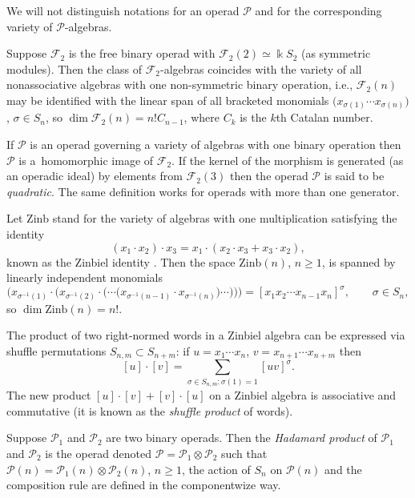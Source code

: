 \documentclass[pdftex]{sigma}
\numberwithin{equation}{section}
\def\Zinb{\mathrm{Zinb}}
\begin{document}
We will not distinguish notations for an operad $\mathcal P$
and for the corresponding variety of $\mathcal P$-algebras.

\begin{Example}
Suppose $\mathcal F_2$ is the free binary operad with
$\mathcal F_2(2) \simeq \Bbbk S_2$ (as symmetric modules).
Then the class of $\mathcal F_2$-algebras
coincides with the variety of all nonassociative
algebras with one non-symmetric binary operation,
i.e., $\mathcal F_2(n)$ may be identified with the
linear span of all bracketed monomials
$\bigl(x_{\sigma(1)}\cdots x_{\sigma(n)}\bigr)$, $\sigma \in S_n$,
so $\dim \mathcal F_2(n) = n! C_{n-1}$, where $C_k$ is the $k$th
Catalan number.
\end{Example}

If $\mathcal P$ is an operad governing a variety
of algebras with one binary operation then
$\mathcal P$ is a~homomorphic image of $\mathcal F_2$.
If the kernel of the morphism is generated (as an operadic ideal) by elements from $\mathcal F_2(3)$ then
the operad $\mathcal P$ is said to be {\em quadratic}.
The same definition works for operads with more than one generator.

\begin{Example}\label{exmp:Zinbiel}
Let $\Zinb$ stand for the variety of algebras with one multiplication
satisfying the identity
%
\begin{equation}\label{eq:Zinbiel}
(x_1\cdot x_2)\cdot x_3
= x_1\cdot (x_2\cdot x_3 + x_3\cdot x_2),
\end{equation}
%
known as the Zinbiel identity \cite{Loday}.
Then the space $\Zinb(n)$, $n\ge 1$, is spanned by
linearly independent monomials
\[
\bigl( x_{\sigma^{-1}(1)}\cdot \bigl(x_{\sigma^{-1}(2)}\cdot \bigl(\cdots \bigl(x_{\sigma^{-1}(n-1)}\cdot x_{\sigma^{-1}(n)}\bigr)\cdots \bigr)\bigr) \bigr)
=
[x_{1}x_{2}\cdots x_{n-1}x_{n}]^\sigma ,
\qquad \sigma \in S_n,
\]
so $\dim \Zinb(n)=n!$.

The product of two right-normed words in a Zinbiel algebra
can be expressed via shuffle permutations $S_{n,m}\subset S_{n+m}$: if $u= x_1\cdots x_n$, $v = x_{n+1}\cdots x_{n+m}$
then
\[
[u]\cdot [v]
=\sum\limits_{\sigma\in S_{n,m}\colon \sigma (1)=1}
[uv]^\sigma .
\]
The new product $[u]\cdot [v] + [v]\cdot [u]$
on a Zinbiel algebra
is associative and commutative (it is known as the {\em shuffle product}
of words).
\end{Example}


Suppose $\mathcal P_1$ and $\mathcal P_2$ are two binary operads.
Then the {\em Hadamard product} of $\mathcal P_1$ and $\mathcal P_2$ is the operad denoted
$\mathcal P= \mathcal P_1\otimes \mathcal P_2$ such that
$\mathcal P(n)= \mathcal P_1(n)\otimes \mathcal P_2(n)$, $n\ge 1$,
the action of $S_n$ on $\mathcal P(n)$ and the composition rule are defined in
the componentwize way.
\end{document}
